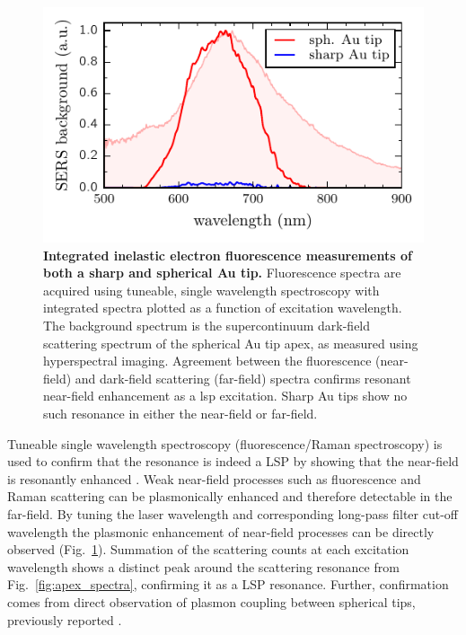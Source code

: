 \documentclass{article}
\begin{document}
\begin{figure}[bt]
\centering
\includegraphics{figures/lsp_confirmation}
\caption[Integrated inelastic electron fluorescence measurements of both a sharp and spherical Au tip]{\textbf{Integrated inelastic electron fluorescence measurements of both a sharp and spherical Au tip.} Fluorescence spectra are acquired using tuneable, single wavelength spectroscopy with integrated spectra plotted as a function of excitation wavelength. The background spectrum is the supercontinuum dark-field scattering spectrum of the spherical Au tip apex, as measured using hyperspectral imaging. Agreement between the fluorescence (near-field) and dark-field scattering (far-field) spectra confirms resonant near-field enhancement as a \gls{lsp} excitation. Sharp Au tips show no such resonance in either the near-field or far-field.}
\label{fig:lsp_confirmation}
\vspace{-5pt}
\end{figure}

Tuneable single wavelength spectroscopy (fluorescence/Raman spectroscopy) is used to confirm that the resonance is indeed a LSP by showing that the near-field is resonantly enhanced \cite{}. Weak near-field processes such as fluorescence and Raman scattering can be plasmonically enhanced and therefore detectable in the far-field. By tuning the laser wavelength and corresponding long-pass filter cut-off wavelength the plasmonic enhancement of near-field processes can be directly observed (Fig.~\ref{fig:lsp_confirmation}). Summation of the scattering counts at each excitation wavelength shows a distinct peak around the scattering resonance from Fig.~\ref{fig:apex_spectra}, confirming it as a LSP resonance.
Further, confirmation comes from direct observation of plasmon coupling between spherical tips, previously reported \cite{savage2012}.
\end{document}
